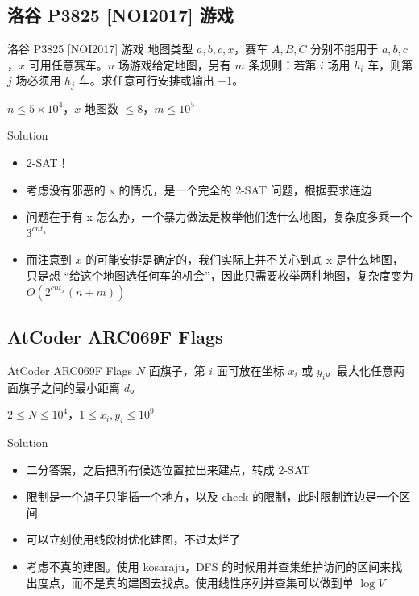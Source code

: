﻿\documentclass[aspectratio=169]{ctexbeamer}
\begin{document}
\subsection{洛谷 P3825 [NOI2017] 游戏}

\begin{frame}{洛谷 P3825 [NOI2017] 游戏}
      地图类型 $a,b,c,x$，赛车 $A,B,C$ 分别不能用于 $a,b,c$，$x$ 可用任意赛车。$n$ 场游戏给定地图，另有 $m$ 条规则：若第 $i$ 场用 $h_i$ 车，则第 $j$ 场必须用 $h_j$ 车。求任意可行安排或输出 $-1$。
      
      $n\le 5\times 10^4$，$x$ 地图数 $\le 8$，$m\le 10^5$
\end{frame}

\begin{frame}{Solution}
    \begin{itemize}
        \item 2-SAT！
        \item 考虑没有邪恶的 x 的情况，是一个完全的 2-SAT 问题，根据要求连边
        \item 问题在于有 x 怎么办，一个暴力做法是枚举他们选什么地图，复杂度多乘一个 $3^{cnt_x}$
        \item 而注意到 $x$ 的可能安排是确定的，我们实际上并不关心到底 x 是什么地图，只是想 “给这个地图选任何车的机会”，因此只需要枚举两种地图，复杂度变为 $O\left(2^{cnt_x}(n+m)\right)$
    \end{itemize}    
\end{frame}



\subsection{AtCoder ARC069F Flags}

\begin{frame}{AtCoder ARC069F Flags}
      $N$ 面旗子，第 $i$ 面可放在坐标 $x_i$ 或 $y_i$。最大化任意两面旗子之间的最小距离 $d$。
      
      $2\le N\le 10^4$，$1\le x_i,y_i\le 10^9$
\end{frame}

\begin{frame}{Solution}
    \begin{itemize}
        \item 二分答案，之后把所有候选位置拉出来建点，转成 2-SAT
        \item 限制是一个旗子只能插一个地方，以及 check 的限制，此时限制连边是一个区间
        \item 可以立刻使用线段树优化建图，不过太烂了
        \item 考虑不真的建图。使用 kosaraju，DFS 的时候用并查集维护访问的区间来找出度点，而不是真的建图去找点。使用线性序列并查集可以做到单 $\log V$
    \end{itemize}    
\end{frame}
\end{document}
